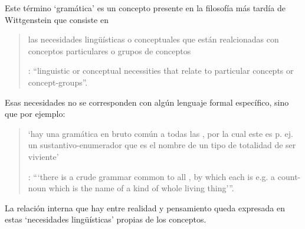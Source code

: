 Este término `gramática' es un concepto presente en la filosofía más tardía de Wittgenstein que consiste en \blockquote[{\Cite[215]{teichmann2008ans}}: \enquote{linguistic or conceptual necessities that relate to particular concepts or concept-groups}.]{las necesidades lingüísticas o conceptuales que están realcionadas con conceptos particulares o grupos de conceptos}. Esas necesidades no se corresponden con algún lenguaje formal específico, sino que por ejemplo: \blockquote[{\Cite[215]{teichmann2008ans}}: \enquote{`there is a crude grammar common to all , by which each is e.g. a count-noun which is the name of a kind of whole living thing'}.]{`hay una gramática en bruto común a todas las , por la cual este es p. ej. un sustantivo-enumerador que es el nombre de un tipo de totalidad de ser viviente'}. La relación interna que hay entre realidad y pensamiento queda expresada en estas `necesidades lingüísticas' propias de los conceptos.


